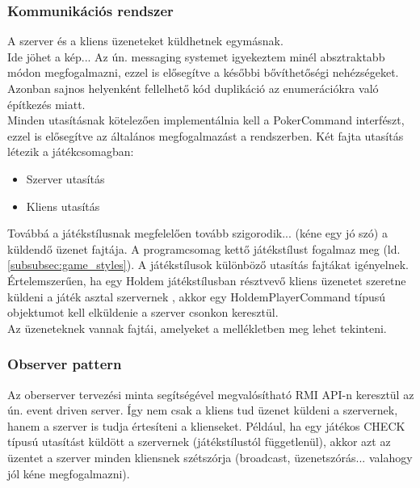 \subsubsection{Kommunikációs rendszer}
A szerver és a kliens  üzeneteket küldhetnek egymásnak. \\
Ide jöhet a kép... Az ún. messaging systemet igyekeztem minél absztraktabb módon megfogalmazni, ezzel is elősegítve a későbbi bővíthetőségi nehézségeket. Azonban sajnos helyenként fellelhető kód duplikáció az enumerációkra való építkezés miatt. \\
Minden utasításnak kötelezően implementálnia kell a PokerCommand interfészt, ezzel is elősegítve az általános megfogalmazást a rendszerben. Két fajta utasítás létezik a játékcsomagban:
\begin{itemize}[leftmargin=2cm]
	\item Szerver utasítás
	\item Kliens utasítás
\end{itemize}
Továbbá a játékstílusnak megfelelően tovább szigorodik... (kéne egy jó szó) a küldendő üzenet fajtája. A programcsomag kettő játékstílust fogalmaz meg (ld. \ref{subsubsec:game_styles}). A játékstílusok különböző utasítás fajtákat igényelnek. Értelemszerűen, ha egy Holdem játékstílusban résztvevő kliens üzenetet szeretne küldeni a játék asztal szervernek , akkor egy HoldemPlayerCommand típusú objektumot kell elküldenie a szerver csonkon keresztül. \\
Az üzeneteknek vannak fajtái, amelyeket a mellékletben meg lehet tekinteni.

\subsubsection{Observer pattern \cite{observer_pattern}}
Az oberserver tervezési minta segítségével megvalósítható RMI API-n keresztül az ún. event driven server. Így nem csak a kliens tud üzenet küldeni a szervernek, hanem a szerver is tudja értesíteni a klienseket. Például, ha egy játékos CHECK típusú utasítást küldött a szervernek (játékstílustól függetlenül), akkor azt az üzentet a szerver minden kliensnek szétszórja (broadcast, üzenetszórás... valahogy jól kéne megfogalmazni).

